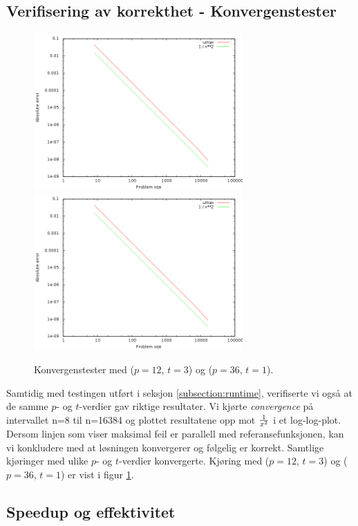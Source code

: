 \documentclass{article}
\begin{document}
\subsection{Verifisering av korrekthet - Konvergenstester}
\begin{figure}[t]
	\centering
	\includegraphics[width=8cm]{img/convergence.png}	
	\includegraphics[width=8cm]{img/convergence.png}	
	\caption{Konvergenstester med ($p=12$, $t=3$) og ($p=36$, $t=1$).}
	\label{fig:convergence}
	
\end{figure}

Samtidig med testingen utført i seksjon \ref{subsection:runtime}, verifiserte vi også at de samme $p$- og $t$-verdier gav riktige resultater. Vi kjørte \emph{convergence} på intervallet n=8 til n=16384 og plottet resultatene opp mot ${1 \over x^2}$ i et log-log-plot. Dersom linjen som viser maksimal feil er parallell med referansefunksjonen, kan vi konkludere med at løsningen konvergerer og følgelig er korrekt. Samtlige kjøringer med ulike $p$- og $t$-verdier konvergerte. Kjøring med ($p=12$, $t=3$) og ($p=36$, $t=1$) er vist i figur \ref{fig:convergence}.

\subsection{Speedup og effektivitet}
\end{document}
